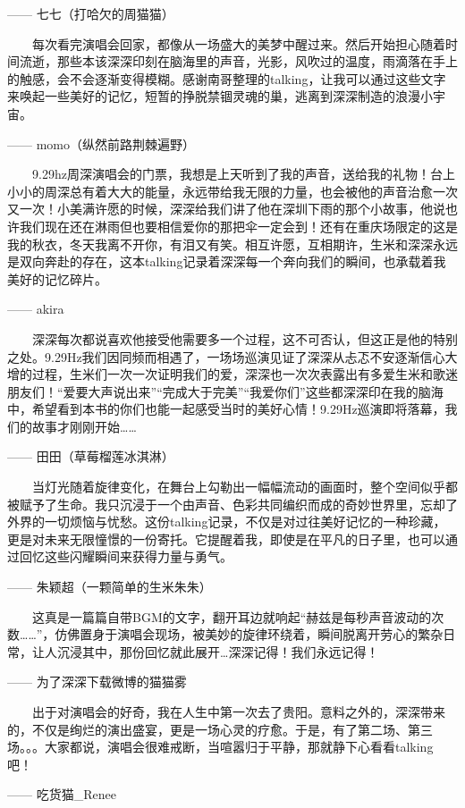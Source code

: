 \documentclass[]{ctexbook}
\begin{document}
------ 七七（打哈欠的周猫猫）

  每次看完演唱会回家，都像从一场盛大的美梦中醒过来。然后开始担心随着时间流逝，那些本该深深印刻在脑海里的声音，光影，风吹过的温度，雨滴落在手上的触感，会不会逐渐变得模糊。感谢南哥整理的talking，让我可以通过这些文字来唤起一些美好的记忆，短暂的挣脱禁锢灵魂的巢，逃离到深深制造的浪漫小宇宙。

------ momo（纵然前路荆棘遍野）

  9.29hz周深演唱会的门票，我想是上天听到了我的声音，送给我的礼物！台上小小的周深总有着大大的能量，永远带给我无限的力量，也会被他的声音治愈一次又一次！小美满许愿的时候，深深给我们讲了他在深圳下雨的那个小故事，他说也许我们现在还在淋雨但也要相信爱你的那把伞一定会到！还有在重庆场限定的这是我的秋衣，冬天我离不开你，有泪又有笑。相互许愿，互相期许，生米和深深永远是双向奔赴的存在，这本talking记录着深深每一个奔向我们的瞬间，也承载着我美好的记忆碎片。

------ akira

  深深每次都说喜欢他接受他需要多一个过程，这不可否认，但这正是他的特别之处。9.29Hz我们因同频而相遇了，一场场巡演见证了深深从忐忑不安逐渐信心大增的过程，生米们一次一次证明我们的爱，深深也一次次表露出有多爱生米和歌迷朋友们！``爱要大声说出来''``完成大于完美''``我爱你们''这些都深深印在我的脑海中，希望看到本书的你们也能一起感受当时的美好心情！9.29Hz巡演即将落幕，我们的故事才刚刚开始\ldots\ldots{}

------ 田田（草莓榴莲冰淇淋）

  当灯光随着旋律变化，在舞台上勾勒出一幅幅流动的画面时，整个空间似乎都被赋予了生命。我只沉浸于一个由声音、色彩共同编织而成的奇妙世界里，忘却了外界的一切烦恼与忧愁。这份talking记录，不仅是对过往美好记忆的一种珍藏，更是对未来无限憧憬的一份寄托。它提醒着我，即使是在平凡的日子里，也可以通过回忆这些闪耀瞬间来获得力量与勇气。

------ 朱颖超（一颗简单的生米朱朱）

  这真是一篇篇自带BGM的文字，翻开耳边就响起``赫兹是每秒声音波动的次数\ldots\ldots''，仿佛置身于演唱会现场，被美妙的旋律环绕着，瞬间脱离开劳心的繁杂日常，让人沉浸其中，那份回忆就此展开\ldots 深深记得！我们永远记得！

------ 为了深深下载微博的猫猫雾

  出于对演唱会的好奇，我在人生中第一次去了贵阳。意料之外的，深深带来的，不仅是绚烂的演出盛宴，更是一场心灵的疗愈。于是，有了第二场、第三场。。。大家都说，演唱会很难戒断，当喧嚣归于平静，那就静下心看看talking吧！

------ 吃货猫\_Renee
\end{document}
